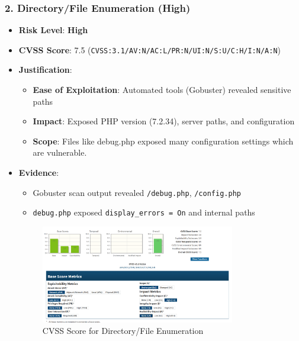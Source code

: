 \documentclass[12pt]{article}
\begin{document}
\subsubsection*{2. Directory/File Enumeration (High)}
\begin{itemize}
    \item \textbf{Risk Level}: \textcolor{high}{\textbf{High}}
    \item \textbf{CVSS Score}: 7.5 (\texttt{CVSS:3.1/AV:N/AC:L/PR:N/UI:N/S:U/C:H/I:N/A:N})
    \item \textbf{Justification}:
    \begin{itemize}
        \item \textbf{Ease of Exploitation}: Automated tools (Gobuster) revealed sensitive paths
        \item \textbf{Impact}: Exposed PHP version (7.2.34), server paths, and configuration
        \item \textbf{Scope}: Files like debug.php exposed many configuration settings which are vulnerable.
    \end{itemize}
    \item \textbf{Evidence}:
    \begin{itemize}
        \item Gobuster scan output revealed \texttt{/debug.php}, \texttt{/config.php}
        \item \texttt{debug.php} exposed \texttt{display\_errors = On} and internal paths
    \end{itemize}
    \begin{figure}[h!]
    \centering
    \includegraphics[width=0.8\textwidth]{RA2.png}
    \caption{CVSS Score for Directory/File Enumeration}
    \label{fig:sql_injection}
    \end{figure}    
    \FloatBarrier
    
\end{itemize}
\end{document}
